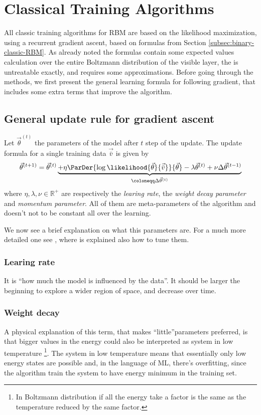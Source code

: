\section{Classical Training Algorithms}
  All classic training algorithms for RBM are based on the likelihood maximization,
  using a recurrent gradient ascent, based on formulas from Section \ref{subsec:binary-classic-RBM}.
  As already noted the formulas contain some expected values calculation over the
  entire Boltzmann distribution of the visible layer, the is untreatable exactly,
  and requires some approximations.
  Before going through the methods, we first present the general learning formula for 
  following gradient,  that includes some extra terms that improve the algorithm.
  
  \subsection{General update rule for gradient ascent} \label{subsec:general-gradient-rules}
  Let \(\vec{\theta}^{(t)}\) the parameters of the model after \(t\) step of the update.
  The update formula for a single training data \(\vec{\bar{v}}\) is given by
  \[
    \vec{\theta}^{(t+1)} = \vec{\theta}^{(t)}
                           \underbrace{
                             + \eta \ParDer{\log\likelihood{\vec{\theta}}{\vec{\bar{v}}}}{\vec{\theta}}
                             - \lambda \vec{\theta}^{(t)}
                             + \nu \Delta\vec{\theta}^{(t-1)}
                           }_{\coloneqq \Delta\vec{\theta}^{(t)}}
  \]
  where \(\eta,\lambda,\nu \in \mathbb{R}^+\) are respectively the \emph{learing rate},
  the \emph{weight decay parameter} and \emph{momentum parameter}.
  All of them are meta-parameters of the algorithm and doesn't not to be constant all
  over the learning.
  
  We now see a brief explanation on what this parameters are. For a much more detailed one
  see \cite{hinton2012practical}, where is explained  also how to tune them.
  \subsubsection{Learing rate}
  It is ``how much the model is influenced by the data''. It should be larger the beginning to
  explore a wider region of space, and decrease over time.
  \subsubsection{Weight decay}
  A physical explanation of this term, that makes ``little''parameters preferred, is that
  bigger values in the energy could also be interpreted as system in low temperature
  \footnote{In Boltzmann distribution if all the energy take a factor is the same as
  the temperature reduced by the same factor.}. The system in low temperature means that
  essentially only low energy states are possible and, in the language of ML, there's overfitting,
  since the algorithm train the system to have energy minimum in the training set.
  
